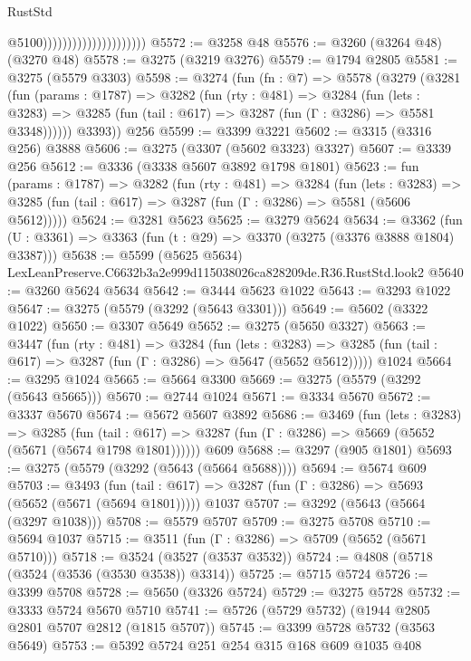 \begin{lexlean}{RustStd}
\begin{coremodule}
                                              @5100)))))))))))))))))))))
@5572 := @3258 @48
@5576 := @3260 (@3264 @48) (@3270 @48)
@5578 := @3275 (@3219 @3276)
@5579 := @1794 @2805
@5581 := @3275 (@5579 @3303)
@5598 := @3274
    (fun (fn : @7) =>
    @5578
      (@3279
        (@3281
          (fun (params : @1787) =>
          @3282
            (fun (rty : @481) =>
            @3284
              (fun (lets : @3283) =>
              @3285 (fun (tail : @617) => @3287 (fun (Γ : @3286) => @5581 @3348))))))
        @3393))
    @256
@5599 := @3399 @3221
@5602 := @3315 (@3316 @256) @3888
@5606 := @3275 (@3307 (@5602 @3323) @3327)
@5607 := @3339 @256
@5612 := @3336 (@3338 @5607 @3892 @1798 @1801)
@5623 := fun (params : @1787) =>
  @3282
    (fun (rty : @481) =>
    @3284
      (fun (lets : @3283) =>
      @3285 (fun (tail : @617) => @3287 (fun (Γ : @3286) => @5581 (@5606 @5612)))))
@5624 := @3281 @5623
@5625 := @3279 @5624
@5634 := @3362 (fun (U : @3361) => @3363 (fun (t : @29) => @3370 (@3275 (@3376 @3888 @1804) @3387)))
@5638 := @5599 (@5625 @5634) LexLeanPreserve.C6632b3a2e999d115038026ca828209de.R36.RustStd.look2
@5640 := @3260 @5624 @5634
@5642 := @3444 @5623 @1022
@5643 := @3293 @1022
@5647 := @3275 (@5579 (@3292 (@5643 @3301)))
@5649 := @5602 (@3322 @1022)
@5650 := @3307 @5649
@5652 := @3275 (@5650 @3327)
@5663 := @3447
    (fun (rty : @481) =>
    @3284
      (fun (lets : @3283) =>
      @3285 (fun (tail : @617) => @3287 (fun (Γ : @3286) => @5647 (@5652 @5612)))))
    @1024
@5664 := @3295 @1024
@5665 := @5664 @3300
@5669 := @3275 (@5579 (@3292 (@5643 @5665)))
@5670 := @2744 @1024
@5671 := @3334 @5670
@5672 := @3337 @5670
@5674 := @5672 @5607 @3892
@5686 := @3469
    (fun (lets : @3283) =>
    @3285
      (fun (tail : @617) => @3287 (fun (Γ : @3286) => @5669 (@5652 (@5671 (@5674 @1798 @1801))))))
    @609
@5688 := @3297 (@905 @1801)
@5693 := @3275 (@5579 (@3292 (@5643 (@5664 @5688))))
@5694 := @5674 @609
@5703 := @3493
    (fun (tail : @617) => @3287 (fun (Γ : @3286) => @5693 (@5652 (@5671 (@5694 @1801)))))
    @1037
@5707 := @3292 (@5643 (@5664 (@3297 @1038)))
@5708 := @5579 @5707
@5709 := @3275 @5708
@5710 := @5694 @1037
@5715 := @3511 (fun (Γ : @3286) => @5709 (@5652 (@5671 @5710)))
@5718 := @3524 (@3527 (@3537 @3532))
@5724 := @4808 (@5718 (@3524 (@3536 (@3530 @3538)) @3314))
@5725 := @5715 @5724
@5726 := @3399 @5708
@5728 := @5650 (@3326 @5724)
@5729 := @3275 @5728
@5732 := @3333 @5724 @5670 @5710
@5741 := @5726 (@5729 @5732) (@1944 @2805 @2801 @5707 @2812 (@1815 @5707))
@5745 := @3399 @5728 @5732 (@3563 @5649)
@5753 := @5392 @5724 @251 @254 @315 @168 @609 @1035 @408

\end{coremodule}
\end{lexlean}
